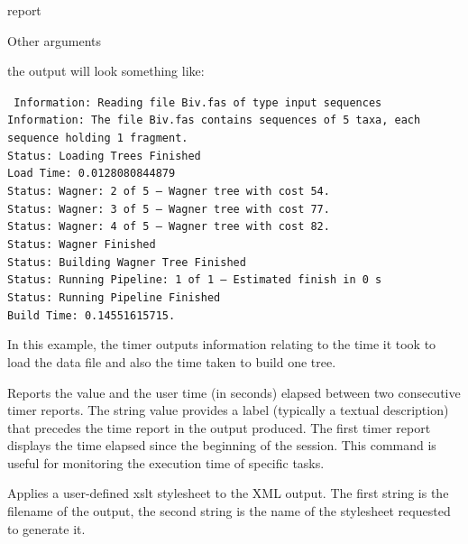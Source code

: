 \begin{command}{report}{}
\begin{arguments}
\begin{argumentgroup}{Other arguments}
\begin{statement}
                the output will look something like:
                \begin{flushleft}     
                    \texttt{
                        Information: Reading file Biv.fas of type input sequences\\
                        Information: The file Biv.fas contains sequences of 5 taxa, each
                                 sequence holding 1 fragment.\\
                        Status: Loading Trees Finished\\
                        Load Time: 0.0128080844879\\
                        Status: Wagner: 2 of 5 -- Wagner tree with cost 54.\\
                        Status: Wagner: 3 of 5 -- Wagner tree with cost 77.\\
                        Status: Wagner: 4 of 5 -- Wagner tree with cost 82.\\
                        Status: Wagner Finished\\
                        Status: Building Wagner Tree Finished\\
                        Status: Running Pipeline: 1 of 1 -- Estimated finish in 0 s\\
                        Status: Running Pipeline Finished\\
                        Build Time: 0.14551615715.}
                \end{flushleft}
                In this example, the timer outputs information relating to the time it took 
                \poy to load the data file and also the time taken to build one tree.
            \end{statement}
     
                {Reports the value and the user time (in seconds) elapsed between
                two consecutive timer reports. The string value provides a label
                (typically a textual description) that precedes the time report
                in the output produced.
                The first timer report displays the time elapsed since the beginning of the
                \poy session. This command is useful for monitoring the execution time
                of specific tasks.}
                {}
            
                {Applies a user-defined xslt stylesheet to the XML output. The first string is
                the filename of the output, the second string is the name of the stylesheet
                requested to generate it.}
                {}
     

\end{argumentgroup}
\end{arguments}
\end{command}
